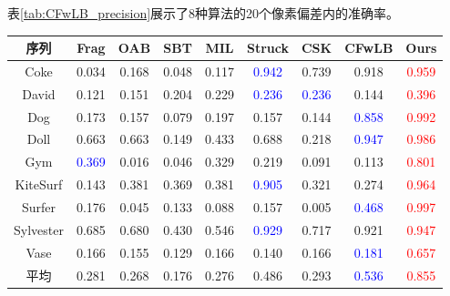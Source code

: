 表\ref{tab:CFwLB_precision}展示了8种算法的20个像素偏差内的准确率。
~\\
\begin{table*}[htbp]
    \centering
    \renewcommand{\arraystretch}{1.5}
    \caption{8种算法20个像素偏差内的准确率}
    \begin{tabular}{|c|c|c|c|c|c|c|c|c|}
        \hline
        序列      & Frag                    & OAB   & SBT   & MIL   & Struck                  & CSK                     & CFwLB                   & Ours                    \\ \hline

        Coke      & 0.034                   & 0.168 & 0.048 & 0.117 & \textcolor{blue}{0.942} & 0.739                   & 0.918                   & \textcolor{red}{0.959}  \\ \hline
        David     & 0.121                   & 0.151 & 0.204 & 0.229 & \textcolor{blue}{0.236} & \textcolor{blue}{0.236} & 0.144                   & \textcolor{red}{0.396}  \\ \hline
        Dog       & 0.173                   & 0.157 & 0.079 & 0.197 & 0.157                   & 0.144                   & \textcolor{blue}{0.858} & \textcolor{red}{0.992}  \\ \hline
        Doll      & 0.663                   & 0.663 & 0.149 & 0.433 & 0.688                   & 0.218                   & \textcolor{blue}{0.947} & \textcolor{red}{ 0.986} \\ \hline
        Gym       & \textcolor{blue}{0.369} & 0.016 & 0.046 & 0.329 & 0.219                   & 0.091                   & 0.113                   & \textcolor{red}{0.801}  \\ \hline
        KiteSurf  & 0.143                   & 0.381 & 0.369 & 0.381 & \textcolor{blue}{0.905} & 0.321                   & 0.274                   & \textcolor{red}{0.964}  \\ \hline
        Surfer    & 0.176                   & 0.045 & 0.133 & 0.088 & 0.157                   & 0.005                   & \textcolor{blue}{0.468} & \textcolor{red}{0.997}  \\ \hline
        Sylvester & 0.685                   & 0.680 & 0.430 & 0.546 & \textcolor{blue}{0.929} & 0.717                   & 0.921                   & \textcolor{red}{0.947}  \\ \hline
        Vase      & 0.166                   & 0.155 & 0.129 & 0.166 & 0.140                   & 0.166                   & \textcolor{blue}{0.181} & \textcolor{red}{0.657}  \\ \hline \hline

        平均      & 0.281                   & 0.268 & 0.176 & 0.276 & 0.486                   & 0.293                   & \textcolor{blue}{0.536} & \textcolor{red}{0.855}  \\ \hline
    \end{tabular}
    \label{tab:CFwLB_precision}
\end{table*}
\setlength{\baselineskip}{20pt}


